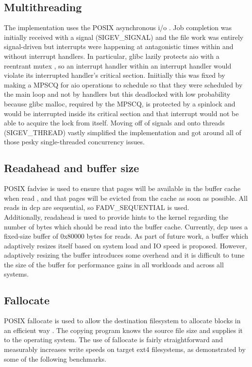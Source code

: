 \documentclass[12pt]{article}
\begin{document}
\subsection{Multithreading}
The implementation uses the POSIX asynchronous i/o \cite{aio}. Job completion was initially
received with a signal (SIGEV\_SIGNAL) and the file work was entirely signal-driven
but interrupts were happening at antagonistic times within and without interrupt
handlers. In particular, glibc lazily protects aio with a reentrant mutex \cite{aio_read}, so an
interrupt handler within an interrupt handler would violate its interrupted handler's
critical section. Iniitially this was fixed by making a MPSCQ for aio operations to schedule
so that they were scheduled by the main loop and not by handlers but this deadlocked with low
probability because glibc malloc, required by the MPSCQ, is protected by a spinlock \cite{malloc} and
would be interrupted inside its critical section and that interrupt would not be
able to acquire the lock from itself. Moving off of signals and onto threads (SIGEV\_THREAD)
vastly simplified the implementation and got around all of those pesky single-threaded
concurrency issues. \\

\subsection{Readahead and buffer size}
POSIX fadvise is used to ensure that pages will be available
in the buffer cache when read \cite{fadvise}, and that pages will be evicted from
the cache as soon as possible. All reads in dcp are
sequential, so FADV\_SEQUENTIAL is used. \\

Additionally, readahead is used to provide hints to the kernel
regarding the number of bytes which should be read into the buffer cache.
Currently, dcp uses a fixed-size buffer of 0x80000 bytes for reads.
As part of future work, a buffer which adaptively resizes itself based on system
load and IO speed is proposed. However, adaptively resizing the buffer introduces
some overhead and it is difficult to tune the size of the buffer for performance gains
in all workloads and across all systems. \\%

\subsection{Fallocate}
POSIX fallocate is used to allow the destination filesystem to
allocate blocks in an efficient way \cite{fallocate}. The copying program knows
the source file size and supplies it to the operating system.
The use of fallocate is fairly straightforward and measurably
increases write speeds on target ext4 filesystems, as demonstrated
by some of the following benchmarks. \\
\end{document}
